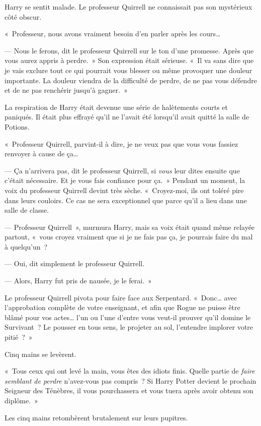 Harry se sentit malade. Le professeur Quirrell ne connaissait pas son mystérieux côté obscur.

«~Professeur, nous avons vraiment besoin d'en parler après les cours…

--- Nous le ferons, dit le professeur Quirrell sur le ton d'une promesse. Après que vous aurez appris à perdre.~» Son expression était sérieuse. «~Il va sans dire que je vais exclure tout ce qui pourrait vous blesser ou même provoquer une douleur importante. La douleur viendra de la difficulté de perdre, de ne pas vous défendre et de ne pas renchérir jusqu'à gagner.~»

La respiration de Harry était devenue une série de halètements courts et paniqués. Il était plus effrayé qu'il ne l'avait été lorsqu'il avait quitté la salle de Potions.

«~Professeur Quirrell, parvint-il à dire, je ne veux pas que vous vous fassiez renvoyer à cause de ça…

--- Ça n'arrivera pas, dit le professeur Quirrell, si \emph{vous} leur dites ensuite que c'était nécessaire. Et je vous fais confiance pour ça.~» Pendant un moment, la voix du professeur Quirrell devint très sèche. «~Croyez-moi, ils ont toléré pire dans leurs couloirs. Ce cas ne sera exceptionnel que parce qu'il a lieu dans une salle de classe.

--- Professeur Quirrell~», murmura Harry, mais sa voix était quand même relayée partout, «~vous croyez vraiment que si je ne fais pas ça, je pourrais faire du mal à quelqu'un~?

--- Oui, dit simplement le professeur Quirrell.

--- Alors, Harry fut pris de nausée, je le ferai.~»

Le professeur Quirrell pivota pour faire face aux Serpentard. «~Donc… avec l'approbation complète de votre enseignant, et afin que Rogue ne puisse être blâmé pour vos actes… l'un ou l'une d'entre vous veut-il prouver qu'il domine le Survivant~? Le pousser en tous sens, le projeter au sol, l'entendre implorer votre pitié~?~»

Cinq mains se levèrent.

«~Tous ceux qui ont levé la main, vous êtes des idiots finis. Quelle partie de \emph{faire semblant de perdre} n'avez-vous pas compris~? Si Harry Potter devient le prochain Seigneur des Ténèbres, il vous pourchassera et vous tuera après avoir obtenu son diplôme.~»

Les cinq mains retombèrent brutalement sur leurs pupitres.

